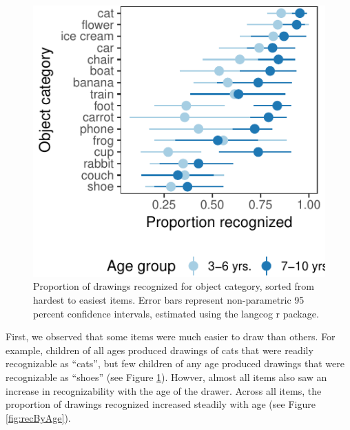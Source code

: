 \documentclass[10pt, letterpaper]{article}
\newenvironment{CodeChunk}{}{}
\begin{document}
\begin{CodeChunk}
\begin{figure}[H]

{\centering \includegraphics{figs/recognizabilityByItem-1} 

}

\caption[Proportion of drawings recognized for object category, sorted from hardest to easiest items]{Proportion of drawings recognized for object category, sorted from hardest to easiest items. Error bars represent non-parametric 95 percent confidence intervals, estimated using the langcog r package.}\label{fig:recognizabilityByItem}
\end{figure}
\end{CodeChunk}

First, we observed that some items were much easier to draw than others.
For example, children of all ages produced drawings of cats that were
readily recognizable as ``cats'', but few children of any age produced
drawings that were recognizable as ``shoes'' (see Figure
\ref{fig:recognizabilityByItem}). Howver, almost all items also saw an
increase in recognizability with the age of the drawer. Across all
items, the proportion of drawings recognized increased steadily with age
(see Figure \ref{fig:recByAge}).
\end{document}
